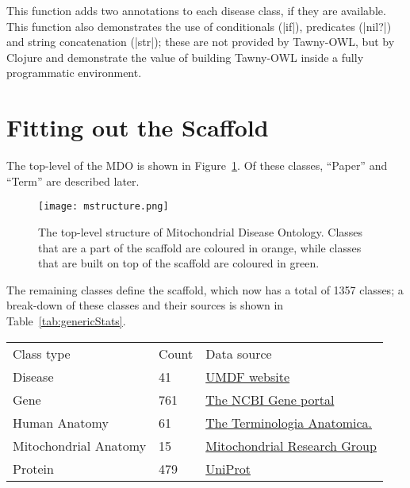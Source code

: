 \documentclass{icbo}
\newcommand{\tawny}{Tawny-OWL\xspace}
\begin{document}
This function adds two annotations to each disease class, if they are
available. This function also demonstrates the use of conditionals
(|if|), predicates (|nil?|) and string concatenation (|str|); these
are not provided by \tawny, but by Clojure and demonstrate the value
of building \tawny inside a fully programmatic environment.

\section{Fitting out the Scaffold}
\label{sec:what-we-have}

The top-level of the MDO is shown in Figure~\ref{fig:mtoplevel}. Of these
classes, ``Paper'' and ``Term'' are described later.

\begin{figure}[]
  \centering
  \texttt{[image: mstructure.png]}
  \caption[Top-level structure]{The top-level structure of Mitochondrial
    Disease Ontology. Classes that are a part of the scaffold are
    coloured in orange, while classes that are built on top of the
    scaffold are coloured in green.}
  \label{fig:mtoplevel}
\end{figure}

The remaining classes define the scaffold, which now has a total of 1357
classes; a break-down of these classes and their sources is shown in
Table~\ref{tab:genericStats}.

\begin{table}[h]
  {\begin{tabular}{lll}
     Class type & Count & Data source \\
     \noalign{\smallskip} \hline \noalign{\smallskip}
     Disease & 41 & \href{http://www.umdf.org/site/c.8qKOJ0MvF7LUG/b.7934629/k.4C9B/Types_of_Mitochondrial_Disease.htm}{UMDF website} \\
     Gene & 761 & \href{http://www.ncbi.nlm.nih.gov/gene}{The NCBI Gene portal} \\
     Human Anatomy & 61 & \href{http://www.unifr.ch/ifaa/}{The Terminologia Anatomica.} \\
     Mitochondrial Anatomy & 15 & \href{http://www.newcastle-mitochondria.com/mitochondria/what-do-mitochondria-do/}{Mitochondrial Research Group} \\
     Protein & 479 & \href{http://www.uniprot.org/}{UniProt} \\
 \end{tabular}}
\end{table}
\end{document}
